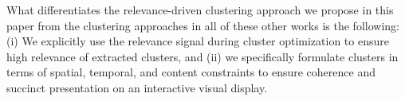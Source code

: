 What differentiates the relevance-driven clustering approach we propose in this paper from the clustering approaches in all of these other works is the following: (i) We explicitly use the relevance signal during cluster optimization to ensure high relevance of extracted clusters, and (ii) we specifically formulate clusters in terms of spatial, temporal, and content constraints to ensure coherence and succinct presentation on an interactive visual display.









